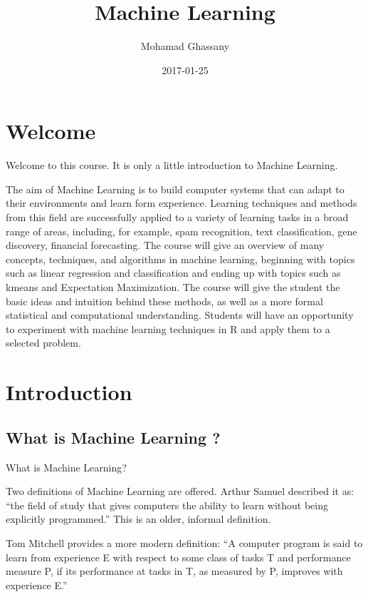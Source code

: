 \documentclass[]{book}
\title{Machine Learning}
\author{Mohamad Ghassany}
\date{2017-01-25}
\begin{document}
\maketitle

{
\setcounter{tocdepth}{2}
\tableofcontents
}
\chapter*{Welcome}\label{welcome}

Welcome to this course. It is only a little introduction to Machine
Learning.

The aim of Machine Learning is to build computer systems that can adapt
to their environments and learn form experience. Learning techniques and
methods from this field are successfully applied to a variety of
learning tasks in a broad range of areas, including, for example, spam
recognition, text classification, gene discovery, financial forecasting.
The course will give an overview of many concepts, techniques, and
algorithms in machine learning, beginning with topics such as linear
regression and classification and ending up with topics such as kmeans
and Expectation Maximization. The course will give the student the basic
ideas and intuition behind these methods, as well as a more formal
statistical and computational understanding. Students will have an
opportunity to experiment with machine learning techniques in R and
apply them to a selected problem.

\chapter*{Introduction}\label{introduction}

\section*{What is Machine Learning ?}\label{what-is-machine-learning}

What is Machine Learning?

Two definitions of Machine Learning are offered. Arthur Samuel described
it as: ``the field of study that gives computers the ability to learn
without being explicitly programmed.'' This is an older, informal
definition.

Tom Mitchell provides a more modern definition: ``A computer program is
said to learn from experience E with respect to some class of tasks T
and performance measure P, if its performance at tasks in T, as measured
by P, improves with experience E.''
\end{document}
